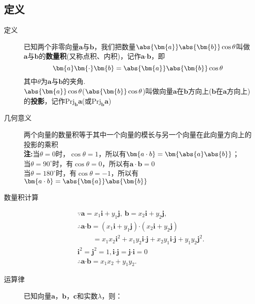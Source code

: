 \begin{Theorem}[平面向量基本定理]
  \subsection{定义}
    \begin{description}
      \item[定义] 已知两个非零向量$ \bm{a} $与$\bm{b}$，我们把数量$ \abs{\bm{a}}\abs{\bm{b}}\cos\theta $叫做$ \bm{a} $与$ \bm{b} $的\textbf{数量积}(又称点积、内积)，记作$ \bm{a}\bm{\cdot}\bm{b} $，即\[\bm{a}\bm{\cdot}\bm{b}=\abs{\bm{a}}\abs{\bm{b}}\cos\theta\]
      其中$ \theta $为$ \bm{a} $与$ \bm{b} $的夹角.\\
      $\abs{\bm{a}}\cos\theta$($\abs{\bm{b}}\cos\theta$)叫做向量$\bm a$在$\bm b$方向上($\bm b$在$\bm a$方向上)的\textbf{投影}，记作$\mathrm{Prj}_{\bm b}{\bm a}$(或$\mathrm{Prj}_{\bm b}{\bm a}$)
      \item[几何意义] 两个向量的数量积等于其中一个向量的模长与另一个向量在此向量方向上的投影的乘积\\%
      {\kaishu \textbf{注:}当$ \theta=0 $时，$ \cos\theta=1 $，所以有$ \bm{a\cdot b}=\bm{\abs{a}\abs{b}} $；\\\phantom{注:\ }当$ \theta=90^{\circ} $时，有$ \cos\theta =0$，所以有$ \bm{a\cdot b}=0 $ \\\phantom{注:\ }当$ \theta=180^{\circ} $时，有$ \cos\theta =-1$，所以有$ \bm{a\cdot b}=\abs{\bm{a}}\abs{\bm{b}} $   }
      \item[数量积计算]
      \begin{equation*}
      \begin{aligned}
      &\because \bm{a}=x_1\bm{i}+y_1\bm{j},~\bm{b}=x_2\bm{i}+y_2\bm{j},\\
      &\therefore \bm{a}\bm{\cdot}\bm{b}=(x_1\bm{i}+y_1\bm{j})\bm{\cdot}(x_2\bm{i}+y_2\bm{j})\\
      &\phantom{\therefore\bm{a}\bm{\cdot}\bm{b}~}=x_1x_2\bm{i}^2+x_1y_2\bm{i}\bm{\cdot}\bm{j}+x_2y_1\bm{i}\bm{\cdot}\bm{j}+y_1y_2\bm{j}^2.\\
      & \bm{i}^2=\bm{j}^2=1,\bm{i}\bm{\cdot}\bm{j}=\bm{j}\bm{\cdot}\bm{i}=0\\
      &\therefore \bm{a}\bm{\cdot}\bm{b}=x_1x_2+y_1y_2.
      \end{aligned}
      \end{equation*}
      \item[运算律]已知向量$\bm a$，$\bm b$，$\bm c$和实数$\lambda$，则：

\end{description}
\end{Theorem}
